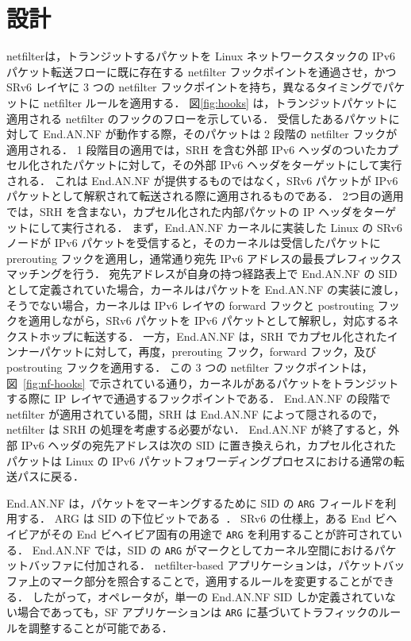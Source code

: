 \section{設計}
\label{section:design}
netfilterは，トランジットするパケットを Linux ネットワークスタックの IPv6 パケット転送フローに既に存在する netfilter フックポイントを通過させ，かつ SRv6 レイヤに 3 つの netfilter フックポイントを持ち，異なるタイミングでパケットに netfilter ルールを適用する．
図\ref*{fig:hooks} は，トランジットパケットに適用される netfilter のフックのフローを示している．
受信したあるパケットに対して End.AN.NF が動作する際，そのパケットは 2 段階の netfilter フックが適用される．
1 段階目の適用では，SRH を含む外部 IPv6 ヘッダのついたカプセル化されたパケットに対して，その外部 IPv6 ヘッダをターゲットにして実行される．
これは End.AN.NF が提供するものではなく，SRv6 パケットが IPv6 パケットとして解釈されて転送される際に適用されるものである．
2つ目の適用では，SRH を含まない，カプセル化された内部パケットの IP ヘッダをターゲットにして実行される．
まず，End.AN.NF カーネルに実装した Linux の SRv6 ノードが IPv6 パケットを受信すると，そのカーネルは受信したパケットに prerouting フックを適用し，通常通り宛先 IPv6 アドレスの最長プレフィックスマッチングを行う．
宛先アドレスが自身の持つ経路表上で End.AN.NF の SID として定義されていた場合，カーネルはパケットを End.AN.NF の実装に渡し，そうでない場合，カーネルは IPv6 レイヤの forward フックと postrouting フックを適用しながら，SRv6 パケットを IPv6 パケットとして解釈し，対応するネクストホップに転送する．
一方，End.AN.NF は，SRH でカプセル化されたインナーパケットに対して，再度，prerouting フック，forward フック，及び postrouting フックを適用する．
この 3 つの netfilter フックポイントは，図~\ref*{fig:nf-hooks} で示されている通り，カーネルがあるパケットをトランジットする際に IP レイヤで通過するフックポイントである．
End.AN.NF の段階で netfilter が適用されている間，SRH は End.AN.NF によって隠されるので，netfilter は SRH の処理を考慮する必要がない．
End.AN.NF が終了すると，外部 IPv6 ヘッダの宛先アドレスは次の SID に置き換えられ，カプセル化されたパケットは Linux の IPv6 パケットフォワーディングプロセスにおける通常の転送パスに戻る．

End.AN.NF は，パケットをマーキングするために SID の \texttt{ARG} フィールドを利用する．
ARG は SID の下位ビットである~\cite{rfc8986}．
SRv6 の仕様上，ある End ビヘイビアがその End ビヘイビア固有の用途で \texttt{ARG} を利用することが許可されている．
End.AN.NF では，SID の \texttt{ARG} がマークとしてカーネル空間におけるパケットバッファに付加される．
netfilter-based アプリケーションは，パケットバッファ上のマーク部分を照合することで，適用するルールを変更することができる．
したがって，オペレータが，単一の End.AN.NF SID しか定義されていない場合であっても，SF アプリケーションは \texttt{ARG} に基づいてトラフィックのルールを調整することが可能である．

